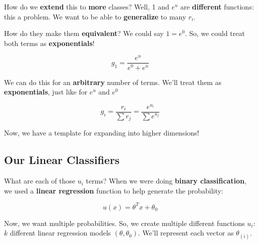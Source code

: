         How do we \textbf{extend} this to \textbf{more} classes? Well, 1 and $e^u$ are \textbf{different} functions: this a problem. We want to be able to \textbf{generalize} to many $r_i$. 
        
        How do they make them \textbf{equivalent}? We could say $1=e^0$. So, we could treat both terms as \textbf{exponentials}!
        
        \begin{equation}
            g_1 = \frac{e^u}{e^0+e^u}
        \end{equation}
        
        We can do this for an \textbf{arbitrary} number of terms. We'll treat them as \textbf{exponentials}, just like for $e^u$ and $e^0$
        
        \begin{equation}
             g_i 
            =             \frac{r_i}{\sum r_j} 
            = 
            \frac{e^{u_i}}{\sum e^{u_j}}
        \end{equation}

        Now, we have a template for expanding into higher dimensions!
        
    \subsection{Our Linear Classifiers}
    
        What are each of those $u_i$ terms? When we were doing \textbf{binary classification}, we used a \textbf{linear regression} function to help generate the probability:
        
        \begin{equation}
            u(x) = \theta^Tx+\theta_0
        \end{equation}

        Now, we want multiple probabilities. So, we create multiple different functions $u_i$: $k$ different linear regression models $(\theta,\theta_0)$. We'll represent each vector as $\theta_{(i)}$.
        
